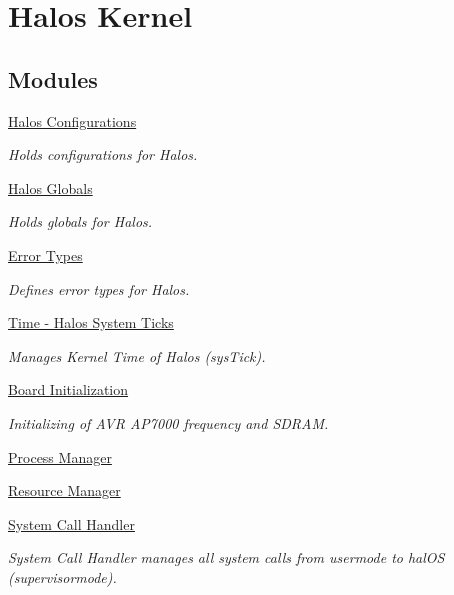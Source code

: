 \hypertarget{group___k_e_r_n_e_l}{
\section{Halos Kernel}
\label{group___k_e_r_n_e_l}
}
\subsection*{Modules}
\begin{CompactItemize}
\item 
\hyperlink{group___c_o_n_f_i_g}{Halos Configurations}
\begin{CompactList}\small\item\em Holds configurations for Halos. \item\end{CompactList}

\item 
\hyperlink{group___g_l_o_b_a_l_s}{Halos Globals}
\begin{CompactList}\small\item\em Holds globals for Halos. \item\end{CompactList}

\item 
\hyperlink{group___e_r_r_o_r_t_y_p_e_s}{Error Types}
\begin{CompactList}\small\item\em Defines error types for Halos. \item\end{CompactList}

\item 
\hyperlink{group___t_i_m_e}{Time - Halos System Ticks}
\begin{CompactList}\small\item\em Manages Kernel Time of Halos (sysTick). \item\end{CompactList}

\item 
\hyperlink{group___i_n_i_t}{Board Initialization}
\begin{CompactList}\small\item\em Initializing of AVR AP7000 frequency and SDRAM. \item\end{CompactList}

\item 
\hyperlink{group___p_r_o_c_e_s_s___m_a_n_a_g_e_r}{Process Manager}
\item 
\hyperlink{group___r_e_s_o_u_r_c_e___m_a_n_a_g_e_r}{Resource Manager}
\item 
\hyperlink{group___s_y_s_t_e_m___c_a_l_l___h_a_n_d_l_e_r}{System Call Handler}
\begin{CompactList}\small\item\em System Call Handler manages all system calls from usermode to halOS (supervisormode). \item\end{CompactList}


\end{CompactItemize}
